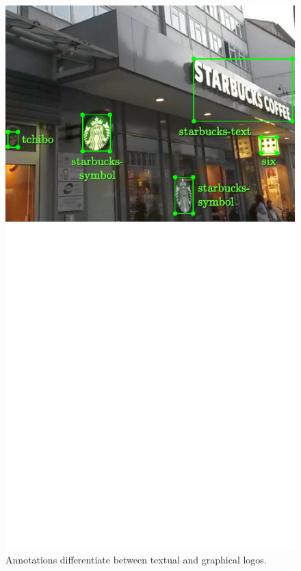 \documentclass[a4paper,twoside]{article}
\begin{document}
\begin{figure}%
\centering%
\includegraphics[width=\linewidth, trim=0cm 9cm 0cm 0cm, clip]{img/annotatedSample.pdf}%
\caption{Annotations differentiate between textual and graphical logos.}%
\label{fig:annotatedSample}
\end{figure}%
%
\end{document}
